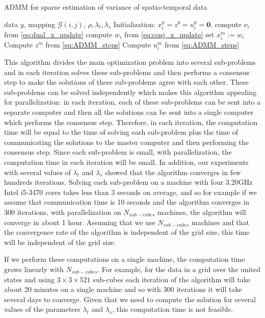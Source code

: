 \documentclass[review]{elsarticle}
\begin{document}
\begin{algorithm}[tb]
	\caption{ADMM for sparse estimation of variance of spatio-temporal data}
	\label{alg:ADMM}
	\begin{algorithmic}
		 data $y$, mapping $\mathscr{G}(i,j)$, $\rho,\lambda_t,\lambda_s$
		\STATE Initialization: $x_i^0=z^0=u_i^0=\textbf{0}$.
				\STATE compute $\nu_i$ from \ref{eq:dual_x_update}
				\STATE compute $w_i$ from \ref{eq:conj_x_update}
				\STATE set $x_i^m:=w_i$
			\ENDFOR
		\STATE Compute $z^m$ from  \ref{eq:ADMM_steps}
		\STATE Compute $u_i^m$ from  \ref{eq:ADMM_steps}
		\ENDFOR
	\end{algorithmic}
\end{algorithm}

This algorithm divides the main optimization problem into several sub-problems and in each iteration solves these sub-problems and then performs a consensus step to make the solutions of these sub-problems agree with each other. These sub-problems can be solved independently which makes this algorithm appealing for parallelization: in each iteration, each of these sub-problems can be sent into a separate computer and then all the solutions can be sent into a single computer which performs the consensus step. Therefore, in each iteration, the computation time will be equal to the time of solving each sub-problem plus the time of communicating the solutions to the master computer and then performing the consensus step. Since each sub-problem is small, with parallelization, the computation time in each iteration will be small. In addition, our experiments with several values of $\lambda_t$ and $\lambda_s$ showed that the algorithm converges in few hundreds iterations. Solving each sub-problem on a machine with four 3.20GHz Intel i5-3470 cores takes less than 3 seconds on average, and so for example if we assume that communication time is 10 seconds and the algorithm converges in 300 iterations, with parallelization on $N_{sub-cubes}$ machines, the algorithm will converge in about 1 hour. Assuming that we use $N_{sub-cubes}$ machines and that the convergence rate of the algorithm is independent of the grid size, this time will be independent of the grid size.

If we perform these computations on a single machine, the computation time grows linearly with $N_{sub-cubes}$. For example, for the data in a grid over the united states and using $3\times3\times521$ sub-cubes each iteration of the algorithm will take about 20 minutes on a single machine and so with 300 iterations it will take several days to converge. Given that we need to compute the solution for several values of the parameters $\lambda_t$ and $\lambda_s$, this computation time is not feasible.
\end{document}
